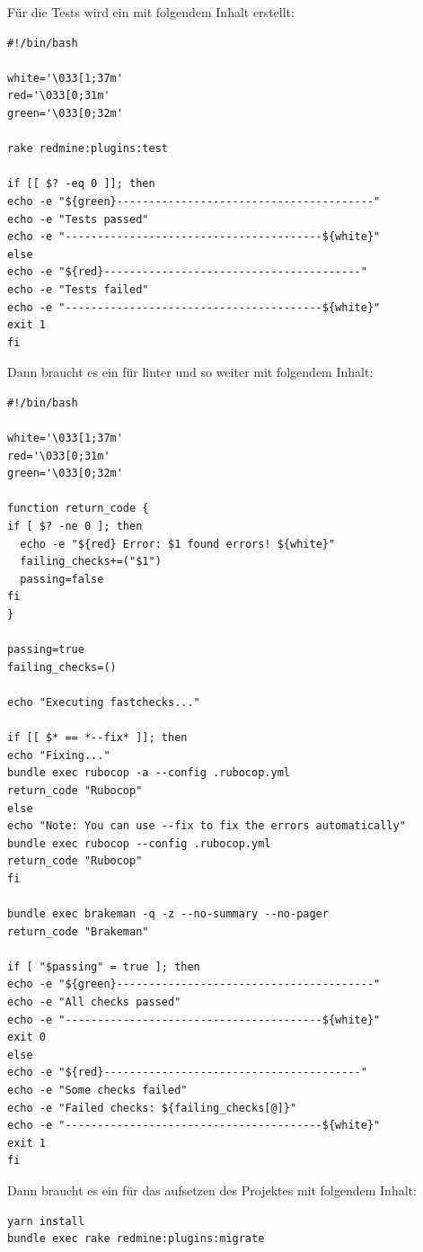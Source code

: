 Für die Tests wird ein  mit folgendem Inhalt erstellt:
\begin{codebox}[]
  \begin{verbatim}
#!/bin/bash

white='\033[1;37m'
red='\033[0;31m'
green='\033[0;32m'

rake redmine:plugins:test

if [[ $? -eq 0 ]]; then
echo -e "${green}----------------------------------------"
echo -e "Tests passed"
echo -e "----------------------------------------${white}"
else
echo -e "${red}----------------------------------------"
echo -e "Tests failed"
echo -e "----------------------------------------${white}"
exit 1
fi
  \end{verbatim}
\end{codebox}

Dann braucht es ein  für linter und so weiter mit folgendem Inhalt:
\begin{codebox}[]
  \begin{verbatim}
#!/bin/bash

white='\033[1;37m'
red='\033[0;31m'
green='\033[0;32m'

function return_code {
if [ $? -ne 0 ]; then
  echo -e "${red} Error: $1 found errors! ${white}"
  failing_checks+=("$1")
  passing=false
fi
}

passing=true
failing_checks=()

echo "Executing fastchecks..."

if [[ $* == *--fix* ]]; then
echo "Fixing..."
bundle exec rubocop -a --config .rubocop.yml
return_code "Rubocop"
else 
echo "Note: You can use --fix to fix the errors automatically"
bundle exec rubocop --config .rubocop.yml
return_code "Rubocop"
fi

bundle exec brakeman -q -z --no-summary --no-pager
return_code "Brakeman"

if [ "$passing" = true ]; then
echo -e "${green}----------------------------------------"
echo -e "All checks passed"
echo -e "----------------------------------------${white}"
exit 0
else
echo -e "${red}----------------------------------------"
echo -e "Some checks failed"
echo -e "Failed checks: ${failing_checks[@]}"
echo -e "----------------------------------------${white}"
exit 1
fi
  \end{verbatim}
\end{codebox}

Dann braucht es ein  für das aufsetzen des Projektes mit folgendem Inhalt:
\begin{codebox}[]
  \begin{verbatim}
yarn install
bundle exec rake redmine:plugins:migrate
  \end{verbatim}
\end{codebox}

